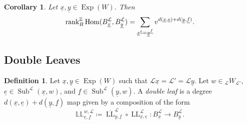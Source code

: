 \documentclass{amsart}
\newcommand{\Z}{\mathbb{Z}}
\newcommand{\scrL}{\mathcal{L}}
\DeclareMathOperator{\Hom}{Hom}
\DeclareMathOperator{\LL}{LL}
\newcommand{\dLL}{\mathbb{L}\mathbb{L}}
\DeclareMathOperator{\Exp}{Exp}
\DeclareMathOperator{\Subexp}{Sub}
\newcommand{\W}[2]{{}_{#1}W_{#2}}
\newcommand{\ue}{\underline{e}}
\newcommand{\uf}{\underline{f}}
\newcommand{\ux}{\underline{x}}
\newcommand{\uy}{\underline{y}}
\newcommand{\grk}{\textnormal{rank}^{\Z}}
\newtheorem{corollary}[subsubsection]{Corollary}
\theoremstyle{definition}
\newtheorem{definition}[subsubsection]{Definition}
\numberwithin{equation}{subsection}
\begin{document}
\begin{corollary}\label{cor:soergel_hom_defects}
    Let $\ux, \uy \in \Exp (W)$.
    Then 
    \[\grk_R \Hom (B_{\ux}^{\scrL}, B_{\uy}^{\scrL}) = \sum_{\ux^{\ue} = \uy^{\uf}} v^{d (\ux, \ue) + d (\uy, \uf)}.\]
\end{corollary}

\subsection{Double Leaves}\label{subsec:alg_dll}

\begin{definition}
    Let $\ux, \uy \in \Exp (W)$ such that $\scrL \ux = \scrL' = \scrL \uy$.
    Let $w \in \W{\scrL}{\scrL'}$, $\ue \in \Subexp^{\scrL} (\ux, w)$, and $\uf \in \Subexp^{\scrL} (\uy, w)$.
    A \emph{double leaf} is a degree $d (\ux, \ue) + d (\uy, \uf)$ map given by a composition of the form 
    \[ \dLL_{\ue,\uf}^{w, \scrL} \coloneq \overline{\LL}_{\uy, \uf}^{\scrL} \circ \LL_{\ux, \ue}^{\scrL} : B_{\ux}^{\scrL} \to B_{\uy}^{\scrL}.\]
\end{definition}
\end{document}
